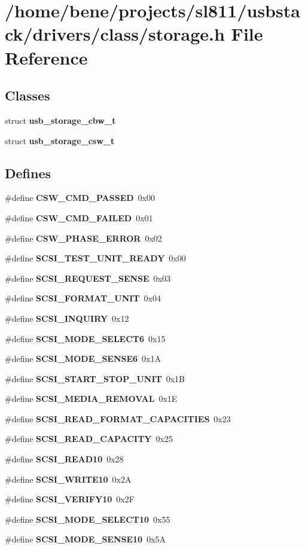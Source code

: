 \section{/home/bene/projects/sl811/usbstack/drivers/class/storage.h File Reference}
\label{storage_8h}
\subsection*{Classes}
\begin{CompactItemize}
\item 
struct {\bf usb\_\-storage\_\-cbw\_\-t}
\item 
struct {\bf usb\_\-storage\_\-csw\_\-t}
\end{CompactItemize}
\subsection*{Defines}
\begin{CompactItemize}
\item 
\#define {\bf CSW\_\-CMD\_\-PASSED}~0x00
\item 
\#define {\bf CSW\_\-CMD\_\-FAILED}~0x01
\item 
\#define {\bf CSW\_\-PHASE\_\-ERROR}~0x02
\item 
\#define {\bf SCSI\_\-TEST\_\-UNIT\_\-READY}~0x00
\item 
\#define {\bf SCSI\_\-REQUEST\_\-SENSE}~0x03
\item 
\#define {\bf SCSI\_\-FORMAT\_\-UNIT}~0x04
\item 
\#define {\bf SCSI\_\-INQUIRY}~0x12
\item 
\#define {\bf SCSI\_\-MODE\_\-SELECT6}~0x15
\item 
\#define {\bf SCSI\_\-MODE\_\-SENSE6}~0x1A
\item 
\#define {\bf SCSI\_\-START\_\-STOP\_\-UNIT}~0x1B
\item 
\#define {\bf SCSI\_\-MEDIA\_\-REMOVAL}~0x1E
\item 
\#define {\bf SCSI\_\-READ\_\-FORMAT\_\-CAPACITIES}~0x23
\item 
\#define {\bf SCSI\_\-READ\_\-CAPACITY}~0x25
\item 
\#define {\bf SCSI\_\-READ10}~0x28
\item 
\#define {\bf SCSI\_\-WRITE10}~0x2A
\item 
\#define {\bf SCSI\_\-VERIFY10}~0x2F
\item 
\#define {\bf SCSI\_\-MODE\_\-SELECT10}~0x55
\item 
\#define {\bf SCSI\_\-MODE\_\-SENSE10}~0x5A
\end{CompactItemize}
